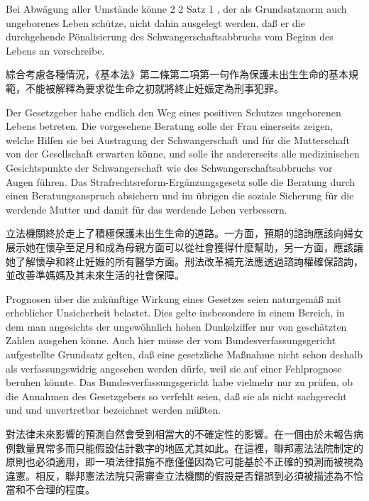 \documentclass[12pt]{article}
\begin{document}
\syncleft
\begin{sourcepara}
Bei Abwägung aller Umstände könne \abbrArt{} 2 \abbrAbs{} 2 Satz 1 \abbrGG{}\ggfnArtTwoTwoOneDE{}, der als Grundsatznorm auch ungeborenes Leben schütze, nicht dahin ausgelegt werden, daß er die durchgehende Pönalisierung des Schwangerschaftsabbruchs vom Beginn des Lebens an vorschreibe.
\end{sourcepara}
\begin{transpara}
綜合考慮各種情況，《基本法》第二條第二項第一句\ggfnArtTwoTwoOneZH{}作為保護未出生生命的基本規範，不能被解釋為要求從生命之初就將終止妊娠定為刑事犯罪。
\end{transpara}

\syncleft
\begin{sourcepara}
Der Gesetzgeber habe endlich den Weg eines positiven Schutzes ungeborenen Lebens betreten. Die vorgesehene Beratung solle der Frau einerseits zeigen, welche Hilfen sie bei Austragung der Schwangerschaft und für die Mutterschaft von der Gesellschaft erwarten könne, und solle ihr andererseits alle medizinischen Gesichtspunkte der Schwangerschaft wie des Schwangerschaftsabbruchs vor Augen führen. Das Strafrechtsreform-Ergänzungsgesetz solle die Beratung durch einen Beratungsanspruch absichern und im übrigen die soziale Sicherung für die werdende Mutter und damit für das werdende Leben verbessern.
\end{sourcepara}
\begin{transpara}
立法機關終於走上了積極保護未出生生命的道路。一方面，預期的諮詢應該向婦女展示她在懷孕至足月和成為母親方面可以從社會獲得什麼幫助，另一方面，應該讓她了解懷孕和終止妊娠的所有醫學方面。刑法改革補充法應透過諮詢權確保諮詢，並改善準媽媽及其未來生活的社會保障。
\end{transpara}

\syncleft
\begin{sourcepara}
Prognosen über die zukünftige Wirkung eines Gesetzes seien naturgemäß mit erheblicher Unsicherheit belastet. Dies gelte insbesondere in einem Bereich, in dem man angesichts der ungewöhnlich hohen Dunkelziffer nur von geschätzten Zahlen ausgehen könne. Auch hier müsse der vom Bundesverfassungsgericht aufgestellte Grundsatz gelten, daß eine gesetzliche Maßnahme nicht schon deshalb als verfassungswidrig angesehen werden dürfe, weil sie auf einer Fehlprognose beruhen könnte. Das Bundesverfassungsgericht habe vielmehr nur zu prüfen, ob die Annahmen des Gesetzgebers so verfehlt seien, daß sie als nicht sachgerecht und und unvertretbar bezeichnet werden müßten.
\end{sourcepara}
\begin{transpara}
對法律未來影響的預測自然會受到相當大的不確定性的影響。在一個由於未報告病例數量異常多而只能假設估計數字的地區尤其如此。在這裡，聯邦憲法法院制定的原則也必須適用，即一項法律措施不應僅僅因為它可能基於不正確的預測而被視為違憲。相反，聯邦憲法法院只需審查立法機關的假設是否錯誤到必須被描述為不恰當和不合理的程度。
\end{transpara}
\end{document}
